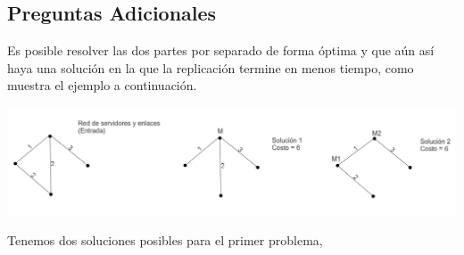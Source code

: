 \subsection{Preguntas Adicionales}
Es posible resolver las dos partes por separado de forma óptima y que aún así haya una solución en la que la replicación termine en menos tiempo, como muestra el ejemplo a continuación.
\begin{center}
\includegraphics[scale=0.4]{ej2/2/graficos/imagen07.jpg} 
\end{center}
Tenemos dos soluciones posibles para el primer problema,